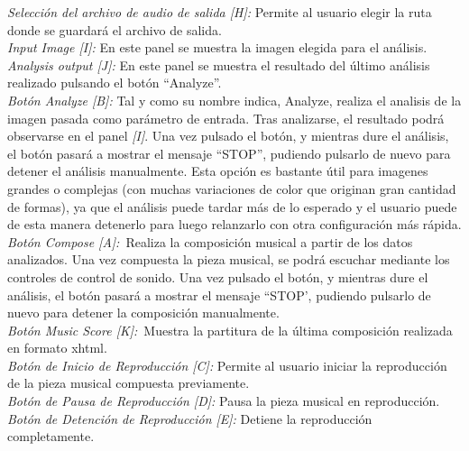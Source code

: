 		\noindent\textit{Selección del archivo de audio de salida [H]:} Permite al usuario elegir la ruta donde se guardará el archivo de salida.\\
		
		\noindent\textit{Input Image [I]:} En este panel se muestra la imagen elegida para el análisis.\\
		
		\noindent\textit{Analysis output [J]:} En este panel se muestra el resultado del último análisis realizado pulsando el botón ``Analyze''.\\
		
		\noindent\textit{Botón Analyze [B]:} Tal y como su nombre indica, Analyze, realiza el analisis de la imagen pasada como parámetro de entrada. Tras analizarse, el resultado podrá observarse en el panel \textit{[I]}. Una vez pulsado el botón, y mientras dure el análisis, el botón pasará a mostrar el mensaje ``STOP'', pudiendo pulsarlo de nuevo para detener el análisis manualmente. Esta opción es bastante útil para imagenes grandes o complejas (con muchas variaciones de color que originan gran cantidad de formas), ya que el análisis puede tardar más de lo esperado y el usuario puede de esta manera detenerlo para luego relanzarlo con otra configuración más rápida.\\
		
		\noindent\textit{Botón Compose [A]:}\ Realiza la composición musical a partir de los datos analizados. Una vez compuesta la pieza musical, se podrá escuchar mediante los controles de control de sonido. Una vez pulsado el botón, y mientras dure el análisis, el botón pasará a mostrar el mensaje ``STOP', pudiendo pulsarlo de nuevo para detener la composición manualmente.\\
		
		\noindent\textit{Botón Music Score [K]:}\ Muestra la partitura de la última composición realizada en formato xhtml.\\
		
		\noindent\textit{Botón de Inicio de Reproducción [C]:} Permite al usuario iniciar la reproducción de la pieza musical compuesta previamente.\\
		
		\noindent\textit{Botón de Pausa de Reproducción [D]:} Pausa la pieza musical en reproducción.\\
		
		\noindent\textit{Botón de Detención de Reproducción [E]:} Detiene la reproducción completamente.\\
		
